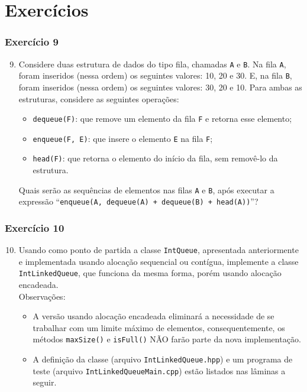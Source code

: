 \documentclass[aspectratio=169]{beamer}
\begin{document}
\section{Exercícios}

\begin{frame}[fragile]\frametitle{Exercício 9}
\begin{enumerate}
	\setcounter{enumi}{8}
	\item Considere duas estrutura de dados do tipo fila, chamadas \texttt{A} e \texttt{B}. Na fila \texttt{A}, foram inseridos (nessa ordem) os seguintes valores: 10, 20 e 30. E, na fila \texttt{B}, foram inseridos (nessa ordem) os seguintes valores: 30, 20 e 10. Para ambas as estruturas, considere as seguintes operações:
\begin{itemize}
	\item \texttt{dequeue(F)}: que remove um elemento da fila \texttt{F} e retorna esse elemento;
	\item \texttt{enqueue(F, E)}: que insere o elemento \texttt{E} na fila \texttt{F};
	\item \texttt{head(F)}: que retorna o elemento do início da fila, sem removê-lo da estrutura.
\end{itemize}
Quais serão as sequências de elementos nas filas \texttt{A} e \texttt{B}, após executar a expressão ``\texttt{enqueue(A, dequeue(A) + dequeue(B) + head(A))}''?
\end{enumerate}
\end{frame}

\begin{frame}[fragile]\frametitle{Exercício 10}
\begin{enumerate}
        \setcounter{enumi}{9}
	\item Usando como ponto de partida a classe \texttt{IntQueue}, apresentada anteriormente e implementada usando alocação sequencial ou contígua, implemente a classe \texttt{IntLinkedQueue}, que funciona da mesma forma, porém usando alocação encadeada.\\
	Observações:
	\begin{itemize}
		\item A versão usando alocação encadeada eliminará a necessidade de se trabalhar com um limite máximo de elementos, consequentemente, os métodos \texttt{maxSize()} e \texttt{isFull()} NÃO farão parte da nova implementação.
		\item A definição da classe (arquivo \texttt{IntLinkedQueue.hpp}) e um programa de teste (arquivo \texttt{IntLinkedQueueMain.cpp}) estão listados nas lâminas a seguir.
	\end{itemize}
\end{enumerate}
\end{frame}
\end{document}
